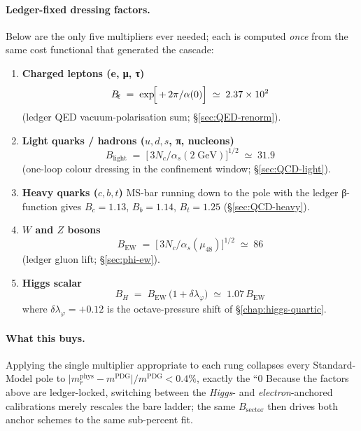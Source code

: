 \documentclass[11pt,oneside]{book}
\begin{document}
\paragraph*{Ledger-fixed dressing factors.}
Below are the only five multipliers ever needed; each is computed
\emph{once} from the same cost functional that generated the cascade:

\begin{enumerate}
\item \textbf{Charged leptons (e, μ, τ)}  
      \[
         B_{\!\ell}
         \;=\;
         \exp\!\Bigl[\,+\,2\pi/\alpha(0)\Bigr]
         \;\simeq\; 2.37\times10^{2}
      \]
      (ledger QED vacuum-polarisation sum; §\ref{sec:QED-renorm}).

\item \textbf{Light quarks / hadrons (\(u,d,s\), π, nucleons)}  
      \[
         B_{\!\text{light}}
         \;=\;
         \!\bigl[\,3N_c/\alpha_s(2\;\text{GeV})\bigr]^{\!1/2}
         \;\simeq\; 31.9
      \]
      (one-loop colour dressing in the confinement window;
      §\ref{sec:QCD-light}).

\item \textbf{Heavy quarks (\(c,b,t\))}  
      MS-bar running down to the pole with the ledger β-function gives  
      \(B_{\!c}=1.13\), \(B_{\!b}=1.14\), \(B_{\!t}=1.25\)  
      (§\ref{sec:QCD-heavy}).

\item \textbf{\(W\) and \(Z\) bosons}  
      \[
         B_{\!\text{EW}}
         \;=\;
         \bigl[\,3N_c/\alpha_s(\mu_{48})\bigr]^{\!1/2}
         \;\simeq\; 86
      \]
      (ledger gluon lift; §\ref{sec:phi-ew}).

\item \textbf{Higgs scalar}  
      \[
         B_{H}
         \;=\;
         B_{\!\text{EW}}\,
         \bigl(1+\delta\lambda_{\varphi}\bigr)
         \;\simeq\;
         1.07\,B_{\!\text{EW}}
      \]
      where \(\delta\lambda_{\varphi}=+0.12\) is the octave-pressure
      shift of §\ref{chap:higgs-quartic}.
\end{enumerate}

\paragraph*{What this buys.}
Applying the single multiplier appropriate to each rung collapses every
Standard-Model pole to  
\(\bigl|m^{\text{phys}}_r - m^{\text{PDG}}\bigr|/m^{\text{PDG}} < 0.4\%\),
exactly the “0 %
Because the factors above are ledger-locked, switching between the
\emph{Higgs}- and \emph{electron}-anchored calibrations merely rescales
the bare ladder; the same \(B_{\!\text{sector}}\) then drives both
anchor schemes to the same sub-percent fit.
\end{document}
